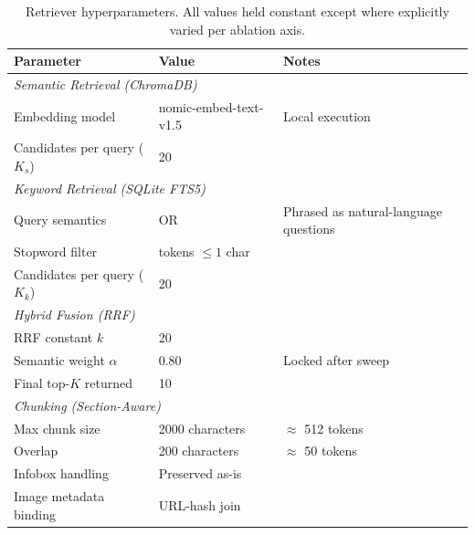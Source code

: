 \documentclass[11pt,a4paper]{article}
\begin{document}
\begin{table}[h]
\caption{Retriever hyperparameters. All values held constant except where explicitly varied per ablation axis.}
\label{tab:retriever-hyperparams}
\centering
\begin{tabular}{lll}
\toprule
\textbf{Parameter} & \textbf{Value} & \textbf{Notes} \\
\midrule
\multicolumn{3}{l}{\textit{Semantic Retrieval (ChromaDB)}} \\
Embedding model & nomic-embed-text-v1.5 & Local execution \\
Candidates per query ($K_s$) & 20 & \\
\midrule
\multicolumn{3}{l}{\textit{Keyword Retrieval (SQLite FTS5)}} \\
Query semantics & OR & Phrased as natural-language questions \\
Stopword filter & tokens $\leq 1$ char & \\
Candidates per query ($K_k$) & 20 & \\
\midrule
\multicolumn{3}{l}{\textit{Hybrid Fusion (RRF)}} \\
RRF constant $k$ & 20 & \\
Semantic weight $\alpha$ & 0.80 & Locked after sweep \\
Final top-$K$ returned & 10 & \\
\midrule
\multicolumn{3}{l}{\textit{Chunking (Section-Aware)}} \\
Max chunk size & 2000 characters & $\approx$ 512 tokens \\
Overlap & 200 characters & $\approx$ 50 tokens \\
Infobox handling & Preserved as-is & \\
Image metadata binding & URL-hash join & \\
\bottomrule
\end{tabular}

\end{table}
\end{document}
